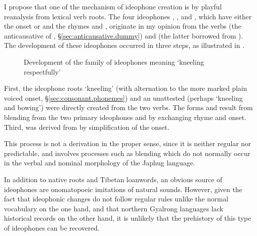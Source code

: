 I propose that one of the mechanism of ideophone creation is by playful reanalysis from lexical verb roots. The four ideophones , ,  and , which have either the onset  or  and the rhymes  and , originate in my opinion from the verbs  (the anticausative of , §\ref{sec:anticausative.dummy}) and  (the latter borrowed from ). The development of these ideophones occurred in three steps, as illustrated in .


\begin{figure}[H]
\caption{Development of the family of ideophones meaning `kneeling respectfully'} \label{fig:idph.dzoR}  
\end{figure}

First, the ideophone roots  `kneeling' (with alternation to the more marked plain voiced  onset, §\ref{sec:consonant.phonemes}) and an unattested  (perhaps `kneeling and bowing') were directly created from the two verbs. The forms  and  result from blending from the two primary ideophones  and  by exchanging rhyme and onset. Third,  was derived from  by simplification of the onset.

This process is not a derivation in the proper sense, since it is neither regular nor predictable, and involves processes such as blending which do not normally occur in the verbal and nominal morphology of the Japhug language.

In addition to native roots and Tibetan loanwords, an obvious source of ideophones are onomatopoeic imitations of natural sounds. However, given the fact that ideophonic changes do not follow regular rules unlike the normal vocabulary on the one hand, and that northern Gyalrong languages lack historical records on the other hand, it is unlikely that the prehistory of this type of ideophones can be recovered.


